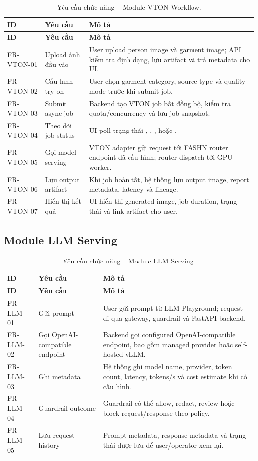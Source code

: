 \documentclass[12pt,a4paper,oneside]{report}
\newcommand{\code}[1]{\texttt{\detokenize{#1}}}
\begin{document}
\begingroup
\small
\begin{longtable}{p{2.05cm}p{4.05cm}p{8.05cm}}
\caption{Yêu cầu chức năng -- Module VTON Workflow.}\\
\toprule
\textbf{ID} & \textbf{Yêu cầu} & \textbf{Mô tả} \\
\midrule
\endfirsthead
\toprule
\textbf{ID} & \textbf{Yêu cầu} & \textbf{Mô tả} \\
\midrule
\endhead
FR-VTON-01 & Upload ảnh đầu vào & User upload person image và garment image; API kiểm tra định dạng, lưu artifact và trả metadata cho UI. \\
FR-VTON-02 & Cấu hình try-on & User chọn garment category, source type và quality mode trước khi submit job. \\
FR-VTON-03 & Submit async job & Backend tạo VTON job bất đồng bộ, kiểm tra quota/concurrency và lưu job snapshot. \\
FR-VTON-04 & Theo dõi job status & UI poll trạng thái \code{accepted}, \code{queued}, \code{running}, \code{completed} hoặc \code{failed}. \\
FR-VTON-05 & Gọi model serving & VTON adapter gửi request tới FASHN router endpoint đã cấu hình; router dispatch tới GPU worker. \\
FR-VTON-06 & Lưu output artifact & Khi job hoàn tất, hệ thống lưu output image, report metadata, latency và lineage. \\
FR-VTON-07 & Hiển thị kết quả & UI hiển thị generated image, job duration, trạng thái và link artifact cho user. \\
\bottomrule
\end{longtable}
\endgroup

\subsection{Module LLM Serving}

\begingroup
\small
\begin{longtable}{p{2.05cm}p{4.05cm}p{8.05cm}}
\caption{Yêu cầu chức năng -- Module LLM Serving.}\\
\toprule
\textbf{ID} & \textbf{Yêu cầu} & \textbf{Mô tả} \\
\midrule
\endfirsthead
\toprule
\textbf{ID} & \textbf{Yêu cầu} & \textbf{Mô tả} \\
\midrule
\endhead
FR-LLM-01 & Gửi prompt & User gửi prompt từ LLM Playground; request đi qua gateway, guardrail và FastAPI backend. \\
FR-LLM-02 & Gọi OpenAI-compatible endpoint & Backend gọi configured OpenAI-compatible endpoint, bao gồm managed provider hoặc self-hosted vLLM. \\
FR-LLM-03 & Ghi metadata & Hệ thống ghi model name, provider, token count, latency, tokens/s và cost estimate khi có cấu hình. \\
FR-LLM-04 & Guardrail outcome & Guardrail có thể allow, redact, review hoặc block request/response theo policy. \\
FR-LLM-05 & Lưu request history & Prompt metadata, response metadata và trạng thái được lưu để user/operator xem lại. \\
\bottomrule
\end{longtable}
\endgroup
\end{document}
